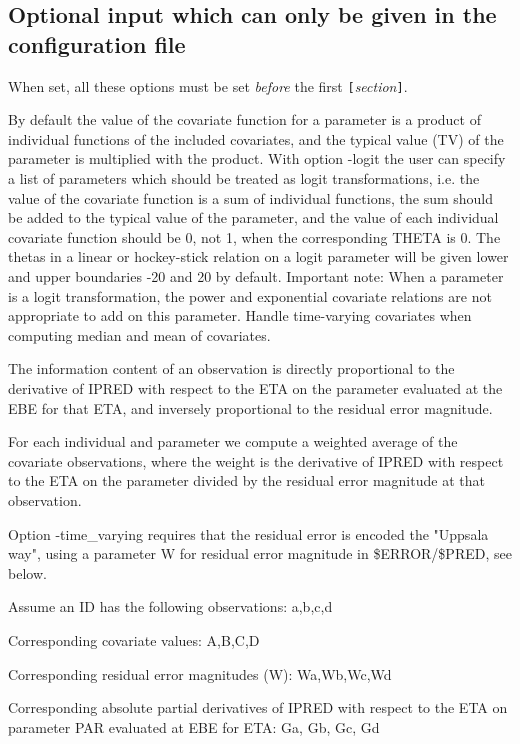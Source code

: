 \subsection{Optional input which can only be given in the configuration file}
When set, all these options must be set \emph{before} the first 
\verb|[|\emph{section}\verb|]|.

\begin{optionlist}
By default the value of the covariate function for a parameter is a  product of individual functions of the included covariates, and the typical value (TV) of the parameter is multiplied with the product. With option -logit the user can specify a list of parameters which should be treated as logit transformations, i.e. the value of the covariate function is a sum of individual functions, the sum should be added to the typical value of the parameter, and the value of each individual covariate function should be 0, not 1, when the corresponding THETA is 0. The thetas in a linear or hockey-stick relation on a logit parameter will be given lower and upper boundaries -20 and 20 by default. Important note: When a parameter is a logit transformation, the power and exponential covariate relations are not appropriate to add on this parameter. 
\nextopt
{}
Handle time-varying covariates when computing median and mean of covariates.

The information content of an observation
is directly proportional to the derivative of IPRED with
respect to the ETA on the parameter evaluated at the EBE for that ETA,
and inversely proportional to the residual error magnitude.

For each individual and parameter
we compute a weighted average of the covariate
observations, where the weight is
the derivative of IPRED with
respect to the ETA on the parameter
divided by the residual error magnitude at that observation.

Option -time\_varying requires that the residual error is
encoded the "Uppsala way", using a parameter W for residual error magnitude
in \$ERROR/\$PRED, see below.

Assume an ID has the following observations: a,b,c,d

Corresponding covariate values: A,B,C,D

Corresponding residual error magnitudes (W): Wa,Wb,Wc,Wd

Corresponding absolute partial derivatives of IPRED with respect
to the ETA on parameter PAR evaluated at EBE for ETA: Ga, Gb, Gc, Gd


\end{optionlist}
